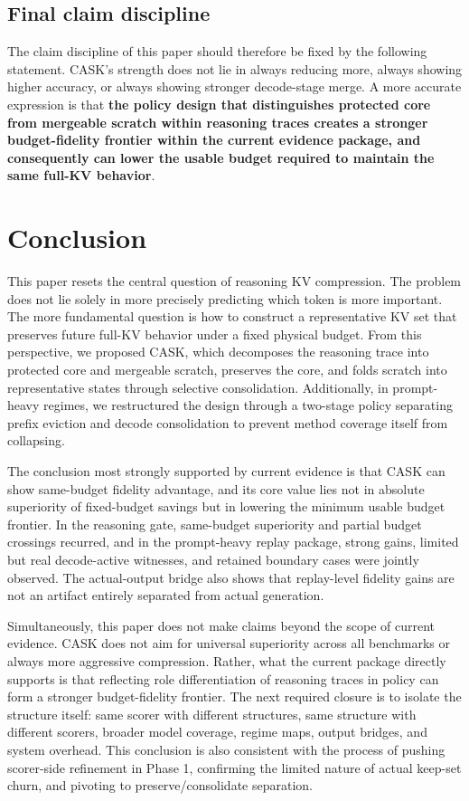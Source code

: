 \subsection{Final claim discipline}


The claim discipline of this paper should therefore be fixed by the following statement. CASK's strength does not lie in always reducing more, always showing higher accuracy, or always showing stronger decode-stage merge. A more accurate expression is that \textbf{the policy design that distinguishes protected core from mergeable scratch within reasoning traces creates a stronger budget-fidelity frontier within the current evidence package, and consequently can lower the usable budget required to maintain the same full-KV behavior}.


\section{Conclusion}


This paper resets the central question of reasoning KV compression. The problem does not lie solely in more precisely predicting which token is more important. The more fundamental question is how to construct a representative KV set that preserves future full-KV behavior under a fixed physical budget. From this perspective, we proposed CASK, which decomposes the reasoning trace into protected core and mergeable scratch, preserves the core, and folds scratch into representative states through selective consolidation. Additionally, in prompt-heavy regimes, we restructured the design through a two-stage policy separating prefix eviction and decode consolidation to prevent method coverage itself from collapsing.


The conclusion most strongly supported by current evidence is that CASK can show same-budget fidelity advantage, and its core value lies not in absolute superiority of fixed-budget savings but in lowering the minimum usable budget frontier. In the reasoning gate, same-budget superiority and partial budget crossings recurred, and in the prompt-heavy replay package, strong gains, limited but real decode-active witnesses, and retained boundary cases were jointly observed. The actual-output bridge also shows that replay-level fidelity gains are not an artifact entirely separated from actual generation.


Simultaneously, this paper does not make claims beyond the scope of current evidence. CASK does not aim for universal superiority across all benchmarks or always more aggressive compression. Rather, what the current package directly supports is that reflecting role differentiation of reasoning traces in policy can form a stronger budget-fidelity frontier. The next required closure is to isolate the structure itself: same scorer with different structures, same structure with different scorers, broader model coverage, regime maps, output bridges, and system overhead. This conclusion is also consistent with the process of pushing scorer-side refinement in Phase 1, confirming the limited nature of actual keep-set churn, and pivoting to preserve/consolidate separation.


